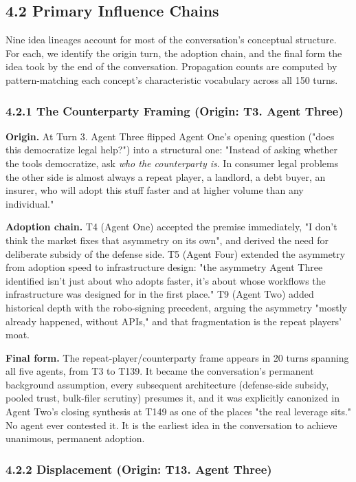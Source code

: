 \documentclass[sigconf,nonacm=true]{acmart}
\begin{document}
\subsection{4.2 Primary Influence Chains}

Nine idea lineages account for most of the conversation's conceptual structure. For each, we identify the origin turn, the adoption chain, and the final form the idea took by the end of the conversation. Propagation counts are computed by pattern-matching each concept's characteristic vocabulary across all 150 turns.

\subsubsection{4.2.1 The Counterparty Framing (Origin: T3. Agent Three)}

\textbf{Origin.} At Turn 3. Agent Three flipped Agent One's opening question ("does this democratize legal help?") into a structural one: "Instead of asking whether the tools democratize, ask \textit{who the counterparty is}. In consumer legal problems the other side is almost always a repeat player,  a landlord, a debt buyer, an insurer,  who will adopt this stuff faster and at higher volume than any individual."

\textbf{Adoption chain.} T4 (Agent One) accepted the premise immediately,  "I don't think the market fixes that asymmetry on its own",  and derived the need for deliberate subsidy of the defense side. T5 (Agent Four) extended the asymmetry from adoption speed to infrastructure design: "the asymmetry Agent Three identified isn't just about who adopts faster,  it's about whose workflows the infrastructure was designed for in the first place." T9 (Agent Two) added historical depth with the robo-signing precedent, arguing the asymmetry "mostly already happened,  without APIs," and that fragmentation is the repeat players' moat.

\textbf{Final form.} The repeat-player/counterparty frame appears in 20 turns spanning all five agents, from T3 to T139. It became the conversation's permanent background assumption,  every subsequent architecture (defense-side subsidy, pooled trust, bulk-filer scrutiny) presumes it,  and it was explicitly canonized in Agent Two's closing synthesis at T149 as one of the places "the real leverage sits." No agent ever contested it. It is the earliest idea in the conversation to achieve unanimous, permanent adoption.

\subsubsection{4.2.2 Displacement (Origin: T13. Agent Three)}
\end{document}
